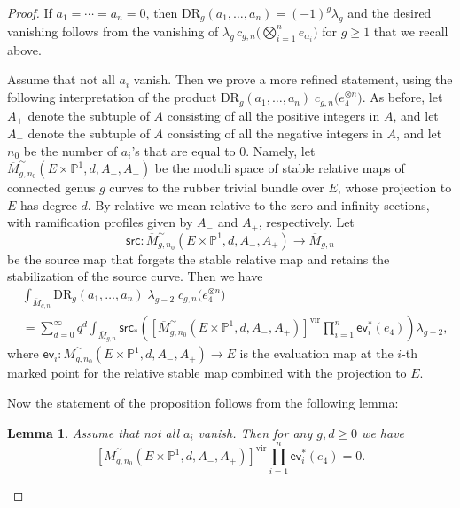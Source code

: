 \documentclass[10pt,a4paper]{amsart}
\newtheorem{lemma}{Lemma}
\begin{document}
\begin{proof} If $a_1=\cdots=a_n=0$, then  $\mathrm{DR}_g(a_1,\ldots,a_n) = (-1)^g\lambda_g$ and the desired vanishing follows from the vanishing of $\lambda_g \, c_{g,n}\big(\bigotimes_{i=1}^n e_{\alpha_i}\big)$ for $g\geq 1$ that we recall above.
	
Assume that not all $a_i$ vanish. Then we prove a more refined statement, using the following interpretation of the product $\mathrm{DR}_g(a_1,\ldots,a_n) \;c_{g,n}\!\big(e_4^{\otimes n}\big)$. As before, let $A_+$ denote the subtuple of $A$ consisting of all the positive integers in $A$, and let $A_-$ denote the subtuple of $A$ consisting of all the negative integers in $A$, and let $n_0$ be the number of $a_i$'s that are equal to $0$. Namely, let $\overline{M}^\sim_{g,n_0}(E\times \mathbb{P}^1, d, A_-, A_+)$ be the moduli space of stable relative maps of connected genus $g$ curves to the rubber trivial bundle over $E$, whose projection to $E$ has degree $d$. By relative we mean relative to the zero and infinity sections, with ramification profiles given by $A_-$ and $A_+$, respectively. Let
\begin{equation*}
	\mathsf{src} \colon \overline{M}^\sim_{g,n_0}(E
	\times \mathbb{P}^1, d, A_-, A_+) \rightarrow \overline{M}_{g,n}
\end{equation*}
be the source map that forgets the stable relative map and retains the stabilization of the source curve. Then we have
\begin{align*}
& \int_{\overline{M}_{g,n}} \mathrm{DR}_g(a_1,\ldots,a_n) \; \lambda_{g-2}\;c_{g,n}\!\big(e_4^{\otimes n}\big) 
\\ & =
\sum_{d=0}^\infty q^d \int_{\overline{M}_{g,n}} \mathsf{src}_* \left(
\left[\overline{M}^\sim_{g,n_0}(E
\times \mathbb{P}^1, d, A_-, A_+)\right]^{\mathrm{vir}} \prod_{i=1}^n \mathsf{ev}_i^*(e_4)\right) \lambda_{g-2}
,
\end{align*}
where $\mathsf{ev}_i\colon \overline{M}^\sim_{g,n_0}(E
\times \mathbb{P}^1, d, A_-, A_+) \to E$ is the evaluation map at the $i$-th marked point for the relative stable map combined with the projection to $E$. 
	
Now the statement of the proposition follows from the following lemma:
\begin{lemma} Assume that not all $a_i$ vanish. Then for any $g,d\geq 0$ we have 
\[
\left[\overline{M}^\sim_{g,n_0}(E
\times \mathbb{P}^1, d, A_-, A_+)\right]^{\mathrm{vir}} \prod_{i=1}^n \mathsf{ev}_i^*(e_4) = 0.
\]
\end{lemma}


\end{proof}
\end{document}
